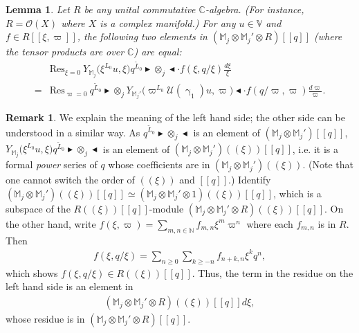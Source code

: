 \documentclass[12pt,a4paper,notitlepage]{report}
\theoremstyle{definition}
\newtheorem{rem}[df]{Remark}
\theoremstyle{plain}
\newtheorem{lm}[df]{Lemma}
\newcommand{\mc}{\mathcal}
\newcommand{\wtd}{\widetilde}
\newcommand{\Res}{\mathrm{Res}}
\newcommand{\scr}{\mathscr}
\newcommand{\Vbb}{\mathbb V}
\newcommand{\Mbb}{\mathbb M}
\newcommand{\Cbb}{\mathbb C}
\newcommand{\Nbb}{\mathbb N}
\newcommand{\btl}{\blacktriangleleft}
\newcommand{\btr}{\blacktriangleright}
\numberwithin{equation}{section}
\begin{document}
\begin{lm}\label{lb37}
Let $R$ be any unital commutative $\Cbb$-algebra. (For instance, $R=\scr O(X)$ where $X$ is a complex manifold.) For any $u\in\Vbb$ and $f\in R[[\xi,\varpi]]$, the following two elements in $(\Mbb_j\otimes\Mbb_j'\otimes R)[[q]]$ (where the tensor products are over $\Cbb$) are equal:
\begin{align}
&\Res_{\xi=0}~Y_{\Mbb_j}\big(\xi^{L_0}u,\xi\big)q^{\wtd L_0}\btr\otimes_j\btl\cdot f(\xi,q/\xi)\frac{d\xi}{\xi}\nonumber\\
=&\Res_{\varpi=0}~q^{\wtd L_0}\btr\otimes_j Y_{\Mbb_j'}\big(\varpi^{L_0}\mc U(\upgamma_1)u,\varpi\big)\btl\cdot f(q/\varpi,\varpi)\frac{d\varpi}{\varpi}.\label{eq110}
\end{align}
\end{lm}


\begin{rem}\label{lb38}
We  explain the meaning of the left hand side; the other side can be understood in a similar way. As   $q^{\wtd L_0}\btr\otimes_j\btl$ is an element of $(\Mbb_j\otimes\Mbb_j')[[q]]$, $Y_{\Mbb_j}\big(\xi^{L_0}u,\xi\big)q^{\wtd L_0}\btr\otimes_j\btl$ is an element of $(\Mbb_j\otimes\Mbb_j')((\xi))[[q]]$, i.e. it is a formal \emph{power} series of $q$ whose coefficients are in $(\Mbb_j\otimes\Mbb_j')((\xi))$. (Note that one cannot switch the order of $((\xi))$ and $[[q]]$.) Identify $(\Mbb_j\otimes\Mbb_j')((\xi))[[q]]\simeq (\Mbb_j\otimes\Mbb_j'\otimes 1)((\xi))[[q]]$, which is a subspace of the $R((\xi))[[q]]$-module $(\Mbb_j\otimes\Mbb_j'\otimes R)((\xi))[[q]]$.  On the other hand,  write $f(\xi,\varpi)=\sum_{m,n\in\Nbb}f_{m,n}\xi^m\varpi^n$ where each $f_{m,n}$ is in $R$. Then
\begin{align*}
f(\xi,q/\xi)=\sum_{n\geq 0}\sum_{k\geq -n}f_{n+k,n}\xi^k q^n,
\end{align*}
which shows $f(\xi,q/\xi)\in R((\xi))[[q]]$. Thus, the term in the residue on the left hand side is an element in
\begin{align*}
(\Mbb_j\otimes\Mbb_j'\otimes R)((\xi))[[q]]d\xi,
\end{align*}
whose residue is in $(\Mbb_j\otimes\Mbb_j'\otimes R)[[q]]$.
\end{rem}
\end{document}
